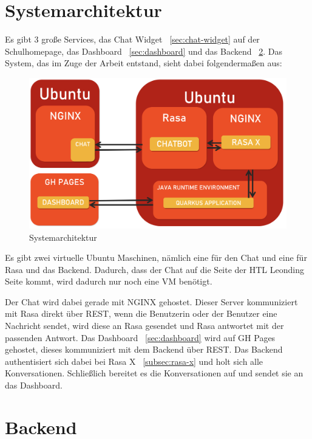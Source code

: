 \section{Systemarchitektur}\label{sec:systemarchitektur}

Es gibt 3 große Services, das Chat Widget ~\ref{sec:chat-widget} auf der Schulhomepage, das Dashboard ~\ref{sec:dashboard} und das Backend ~\ref{sec:backend}.
Das System, das im Zuge der Arbeit entstand, sieht dabei folgendermaßen aus:

\begin{figure}[hbt!]
    \centering
    \includegraphics[scale=0.2]{pics/systemarchitektur}
    \caption{Systemarchitektur}
    \label{fig:impl:architektur}
\end{figure}

Es gibt zwei virtuelle Ubuntu Maschinen, nämlich eine für den Chat und eine für Rasa und das Backend.
Dadurch, dass der Chat auf die Seite der HTL Leonding Seite kommt, wird dadurch nur noch eine VM benötigt.

Der Chat wird dabei gerade mit NGINX gehostet.
Dieser Server kommuniziert mit Rasa direkt über REST, wenn die Benutzerin oder der Benutzer eine Nachricht sendet, wird diese an Rasa gesendet und Rasa antwortet mit der passenden Antwort.
Das Dashboard ~\ref{sec:dashboard} wird auf GH Pages gehostet, dieses kommuniziert mit dem Backend über REST.
Das Backend authentisiert sich dabei bei Rasa X ~\ref{subsec:rasa-x} und holt sich alle Konversationen.
Schließlich bereitet es die Konversationen auf und sendet sie an das Dashboard.

\section{Backend}\label{sec:backend}

